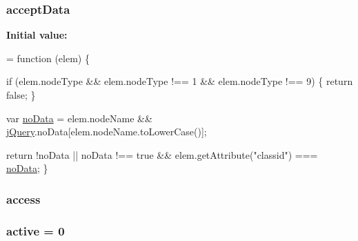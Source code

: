 \subsubsection[{\texorpdfstring{accept\+Data}{acceptData}}]{ accept\+Data}\hypertarget{jquery-2_82_81-vsdoc_8js_a7d1dabc0af68f7b43c5cc81f1e61bf29}{}\label{jquery-2_82_81-vsdoc_8js_a7d1dabc0af68f7b43c5cc81f1e61bf29}
{\bfseries Initial value\+:}
\begin{DoxyCode}
= \textcolor{keyword}{function} (elem) \{

        
        \textcolor{keywordflow}{if} (elem.nodeType && elem.nodeType !== 1 && elem.nodeType !== 9) \{
            \textcolor{keywordflow}{return} \textcolor{keyword}{false};
        \}

        var \hyperlink{jquery-2_82_81-vsdoc_8js_ad32d84c9593cb0546704f6bd04d32386}{noData} = elem.nodeName && \hyperlink{jquery-2_82_81-vsdoc_8js_add5237586d970a38a81f990e8eb28c6c}{jQuery}.noData[elem.nodeName.toLowerCase()];

        
        \textcolor{keywordflow}{return} !noData || noData !== \textcolor{keyword}{true} && elem.getAttribute(\textcolor{stringliteral}{"classid"}) === 
      \hyperlink{jquery-2_82_81-vsdoc_8js_ad32d84c9593cb0546704f6bd04d32386}{noData};
    \}
\end{DoxyCode}
\subsubsection[{\texorpdfstring{access}{access}}]{ access}\hypertarget{jquery-2_82_81-vsdoc_8js_a130ad18d21e14ee566dbf4eb185f2bda}{}\label{jquery-2_82_81-vsdoc_8js_a130ad18d21e14ee566dbf4eb185f2bda}
\subsubsection[{\texorpdfstring{active}{active}}]{ active = 0}\hypertarget{jquery-2_82_81-vsdoc_8js_ac7f6e8b6e2af70e6c0b36fc55e86f61b}{}\label{jquery-2_82_81-vsdoc_8js_ac7f6e8b6e2af70e6c0b36fc55e86f61b}
